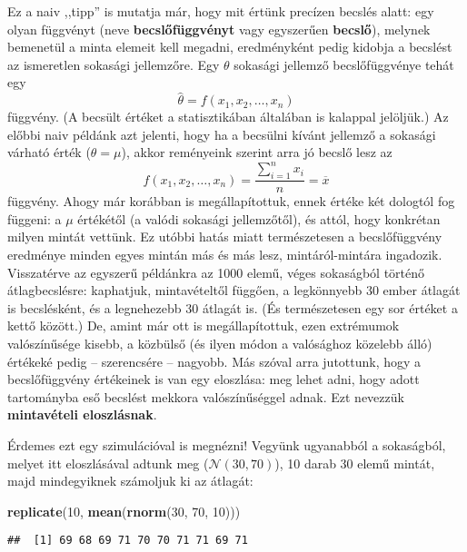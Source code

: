 \documentclass[]{book}
\newenvironment{Shaded}{\begin{snugshade}}{\end{snugshade}}
\newcommand{\KeywordTok}[1]{\textcolor[rgb]{0.13,0.29,0.53}{\textbf{#1}}}
\newcommand{\DecValTok}[1]{\textcolor[rgb]{0.00,0.00,0.81}{#1}}
\newcommand{\NormalTok}[1]{#1}
\begin{document}
Ez a naiv ,,tipp'' is mutatja már, hogy mit értünk precízen becslés
alatt: egy olyan függvényt (neve \textbf{becslőfüggvényt} vagy
egyszerűen \textbf{becslő}), melynek bemenetül a minta elemeit kell
megadni, eredményként pedig kidobja a becslést az ismeretlen sokasági
jellemzőre. Egy \(\theta\) sokasági jellemző becslőfüggvénye tehát egy
\[
    \widehat{\theta} = f\left(x_1,x_2,\ldots,x_n\right)
\] függvény. (A becsült értéket a statisztikában általában is kalappal
jelöljük.) Az előbbi naiv példánk azt jelenti, hogy ha a becsülni kívánt
jellemző a sokasági várható érték (\(\theta=\mu\)), akkor reményeink
szerint arra jó becslő lesz az \[
    f\left(x_1,x_2,\ldots,x_n\right)=\frac{\sum_{i=1}^n x_i}{n}=\overline{x}
\] függvény. Ahogy már korábban is megállapítottuk, ennek értéke két
dologtól fog függeni: a \(\mu\) értékétől (a valódi sokasági
jellemzőtől), és attól, hogy konkrétan milyen mintát vettünk. Ez utóbbi
hatás miatt természetesen a becslőfüggvény eredménye minden egyes mintán
más és más lesz, mintáról-mintára ingadozik. Visszatérve az egyszerű
példánkra az 1000 elemű, véges sokaságból történő átlagbecslésre:
kaphatjuk, mintavételtől függően, a legkönnyebb 30 ember átlagát is
becslésként, és a legnehezebb 30 átlagát is. (És természetesen egy sor
értéket a kettő között.) De, amint már ott is megállapítottuk, ezen
extrémumok valószínűsége kisebb, a közbülső (és ilyen módon a valósághoz
közelebb álló) értékeké pedig -- szerencsére -- nagyobb. Más szóval arra
jutottunk, hogy a becslőfüggvény értékeinek is van egy eloszlása: meg
lehet adni, hogy adott tartományba eső becslést mekkora valószínűséggel
adnak. Ezt nevezzük \textbf{mintavételi eloszlásnak}.

Érdemes ezt egy szimulációval is megnézni! Vegyünk ugyanabból a
sokaságból, melyet itt eloszlásával adtunk meg
(\(\mathcal{N}\left(30,70\right)\)), 10 darab 30 elemű mintát, majd
mindegyiknek számoljuk ki az átlagát:

\begin{Shaded}
\begin{Highlighting}[]
\KeywordTok{replicate}\NormalTok{(}\DecValTok{10}\NormalTok{, }\KeywordTok{mean}\NormalTok{(}\KeywordTok{rnorm}\NormalTok{(}\DecValTok{30}\NormalTok{, }\DecValTok{70}\NormalTok{, }\DecValTok{10}\NormalTok{)))}
\end{Highlighting}
\end{Shaded}

\begin{verbatim}
##  [1] 69 68 69 71 70 70 71 71 69 71
\end{verbatim}
\end{document}
